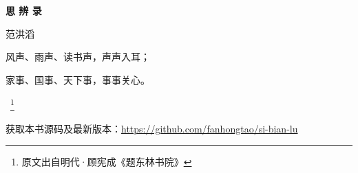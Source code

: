 \begin{titlepage}
    \begin{center}
        \vspace*{3cm}

        {\Huge \textbf{思 \qquad 辨 \qquad 录} }

        \vspace{2cm}

        {\LARGE 范洪滔}

        \vfill

        \begin{varwidth}[t]{\linewidth}
            风声、雨声、读书声，声声入耳；

            家事、国事、天下事，事事关心。
        \end{varwidth} \, \footnote{原文出自明代·顾宪成《题东林书院》}

        \vfill

        获取本书源码及最新版本：\url{https://github.com/fanhongtao/si-bian-lu}
    \end{center}
\end{titlepage}
